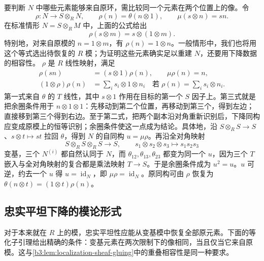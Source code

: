 \ProseParagraphBreak
要判断 \(N\) 中哪些元素能够来自原环，需比较同一个元素在两个位置上的像。令
\[
	\rho:N\longrightarrow S\otimes_RN,\qquad \rho(n)=\theta(n\otimes1),\qquad \mu(s\otimes n)=sn.
\]
在标准情形 \(N=S\otimes_RM\) 中，上面的公式给出
\[
	\rho(s\otimes m)=s\otimes(1\otimes m).
\]
特别地，对来自原模的 \(n=1\otimes m\)，有 \(\rho(n)=1\otimes n\)。一般情形中，我们也将用这个等式选出待恢复的 \(R\) 模；为证明这些元素确实足以重建 \(N\)，还要用下降数据的相容性。 \(\rho\) 是 \(R\) 线性映射，满足
\begin{equation}\label{b3:eq:descent-coaction}
	\begin{split}
		\rho(sn)&=(s\otimes1)\rho(n),\qquad \mu\rho(n)=n,\\
		(1\otimes\rho)\rho(n)&=\sum_i s_i\otimes1\otimes n_i \quad\text{若}\;\rho(n)=\sum_i s_i\otimes n_i.
	\end{split}
\end{equation}
第一式来自 \(\theta\) 的 \(T\) 线性，其中 \(s\otimes1\) 作用在目标的第一个 \(S\) 因子上。第三式就是把余圈条件用于 \(n\otimes1\otimes1\)：先移动到第二个位置，再移动到第三个，得到左边；直接移到第三个得到右边。至于第二式，把两个副本沿对角重新识别后，下降同构应变成原模上的恒等识别；余圈条件使这一点成为结论。具体地，沿 \(S\otimes_RS\to S\)、\(s\otimes t\mapsto st\) 拉回 \(\theta\)，得到 \(N\) 的自同构 \(u=\mu\rho\)。再沿全对角映射
\[
	S\otimes_RS\otimes_RS\longrightarrow S, \qquad s_1\otimes s_2\otimes s_3\longmapsto s_1s_2s_3
\]
变基，三个 \(N^{(i)}\) 都自然认同于 \(N\)，而 \(\theta_{12},\theta_{13},\theta_{23}\) 都变为同一个 \(u\)，因为三个 \(T\) 嵌入与全对角映射的复合都是乘法映射 \(T\to S\)。于是余圈条件成为 \(u^2=u\)。\(u\) 可逆，约去一个 \(u\) 得 \(u=\operatorname{id}_N\)，即 \(\mu\rho=\operatorname{id}_N\)。原同构可由 \(\rho\) 恢复为 \(\theta(n\otimes t)=(1\otimes t)\rho(n)\)。

\subsection{忠实平坦下降的模论形式}
\label{b3:subsec:1206:02}

对于本来就在 \(R\) 上的模，忠实平坦性应能从变基模中恢复全部原元素。下面的等化子引理给出精确的条件：变基元素在两次限制下的像相同，当且仅当它来自原模。这与\cref{b3:lem:localization-sheaf-gluing}中的重叠相容性是同一种要求。

